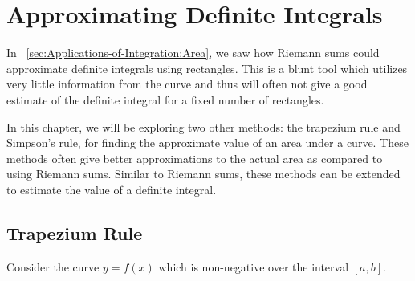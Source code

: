 \section{Approximating Definite Integrals}

In \SS~\ref{sec:Applications-of-Integration:Area}, we saw how Riemann sums could approximate definite integrals using rectangles. This is a blunt tool which utilizes very little information from the curve and thus will often not give a good estimate of the definite integral for a fixed number of rectangles.

In this chapter, we will be exploring two other methods: the trapezium rule and Simpson's rule, for finding the approximate value of an area under a curve. These methods often give better approximations to the actual area as compared to using Riemann sums. Similar to Riemann sums, these methods can be extended to estimate the value of a definite integral.

\subsection{Trapezium Rule}

Consider the curve $y = f(x)$ which is non-negative over the interval $[a, b]$.

\begin{figure}[H]
    \centering
    \caption{}
\end{figure}

